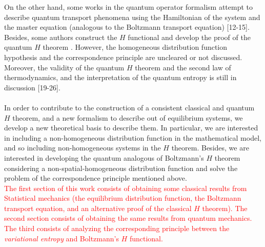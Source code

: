 \documentclass{article}
\begin{document}
On the other hand, some works in the quantum operator formalism attempt to describe quantum transport phenomena using the Hamiltonian of the system and the master equation (analogous to the Boltzmann transport equation) [12-15]. 
Besides, some authors construct the $H$ functional and develop the proof of the quantum $H$ theorem \cite{htheorem2, quantum1, quantum2}. However, the homogeneous distribution function hypothesis and the correspondence principle are uncleared or not discussed. Moreover, the validity of the quantum $H$ theorem and the second law of thermodynamics, and the interpretation of the quantum entropy is still in discussion [19-26].\\ 
\\
In order to contribute to the construction of a consistent classical and quantum $H$ theorem, and a new formalism to describe out of equilibrium systems, we develop a new theoretical basis to describe them. In particular, we are interested in including a non-homogeneous distribution function in the mathematical model, and so including non-homogeneous systems in the $H$ theorem. Besides, we are interested in developing the quantum analogous of Boltzmann's $H$ theorem considering a non-spatial-homogeneous distribution function and solve the problem of the correspondence principle mentioned above.\\
\textcolor{red}{The first section of this work consists of obtaining some classical results from Statistical mechanics (the equilibrium distribution function, the Boltzmann transport equation, and an alternative proof of the classical $H$ theorem). The second section consists of obtaining the same results from quantum mechanics. The third consists of analyzing the corresponding principle between the \textit{variational entropy} and Boltzmann's $H$ functional.}
\end{document}
